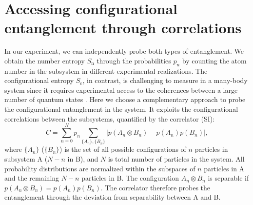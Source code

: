 \section{Accessing configurational entanglement through correlations}
In our experiment, we can independently probe both types of entanglement. We obtain the number entropy $S_\text{n}$ through the probabilities $p_n$ by counting the atom number in the subsystem in different experimental realizations. The configurational entropy $S_\text{c}$, in contrast, is challenging to measure in a many-body system since it requires experimental access to the coherences between a large number of quantum states \cite{Islam2015, Elben2017}. Here we choose a complementary approach to probe the configurational entanglement in the system. It exploits the configurational correlations between the subsystems, quantified by the correlator (SI):
\begin{equation}
C = \sum_{n=0}^{N}p_n \sum_{\{A_{n}\},\{B_{n}\}}\left| p(A_{n} \otimes B_{n}) - p(A_{n}) p(B_{n}) \right| ,
\end{equation}
where $\{A_{n}\}$ ($\{B_{n}\}$) is the set of all possible configurations of $n$ particles in subsystem A ($N-n$ in B), and $N$ is total number of particles in the system. All probability distributions are normalized within the subspaces of $n$ particles in A and the remaining $N-n$ particles in B. The configuration $A_{n} \otimes B_{n}$ is separable if $p(A_{n} \otimes B_{n}) = p(A_{n}) p(B_{n})$. The correlator therefore probes the entanglement through the deviation from separability between A and B. 

